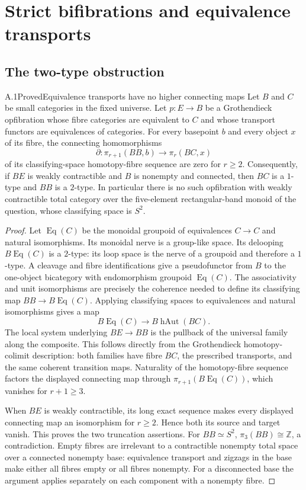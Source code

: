 \section{Strict bifibrations and equivalence transports}
\subsection{The two-type obstruction}

\begin{result}{A.1}{Proved}{Equivalence transports have no higher connecting maps}
Let $B$ and $C$ be small categories in the fixed universe. Let $p:E\to B$ be a Grothendieck opfibration whose fibre categories are equivalent to $C$ and whose transport functors are equivalences of categories. For every basepoint $b$ and every object $x$ of its fibre, the connecting homomorphisms
\[
 \partial:\pi_{r+1}(BB,b)\longrightarrow\pi_r(BC,x)
\]
of its classifying-space homotopy-fibre sequence are zero for $r\geq2$. Consequently, if $BE$ is weakly contractible and $B$ is nonempty and connected, then $BC$ is a $1$-type and $BB$ is a $2$-type. In particular there is no such opfibration with weakly contractible total category over the five-element rectangular-band monoid of the question, whose classifying space is $S^2$.
\end{result}
\begin{proof}
Let $\operatorname{Eq}(C)$ be the monoidal groupoid of equivalences $C\to C$ and natural isomorphisms. Its monoidal nerve is a group-like space. Its delooping $B\operatorname{Eq}(C)$ is a $2$-type: its loop space is the nerve of a groupoid and therefore a $1$-type. A cleavage and fibre identifications give a pseudofunctor from $B$ to the one-object bicategory with endomorphism groupoid $\operatorname{Eq}(C)$. The associativity and unit isomorphisms are precisely the coherence needed to define its classifying map $BB\to B\operatorname{Eq}(C)$. Applying classifying spaces to equivalences and natural isomorphisms gives a map
\[
 B\operatorname{Eq}(C)\longrightarrow B\operatorname{hAut}(BC).
\]
The local system underlying $BE\to BB$ is the pullback of the universal family along the composite. This follows directly from the Grothendieck homotopy-colimit description: both families have fibre $BC$, the prescribed transports, and the same coherent transition maps. Naturality of the homotopy-fibre sequence factors the displayed connecting map through $\pi_{r+1}(B\operatorname{Eq}(C))$, which vanishes for $r+1\geq3$.

When $BE$ is weakly contractible, its long exact sequence makes every displayed connecting map an isomorphism for $r\geq2$. Hence both its source and target vanish. This proves the two truncation assertions. For $BB\simeq S^2$, $\pi_3(BB)\cong\mathbb Z$, a contradiction. Empty fibres are irrelevant to a contractible nonempty total space over a connected nonempty base: equivalence transport and zigzags in the base make either all fibres empty or all fibres nonempty. For a disconnected base the argument applies separately on each component with a nonempty fibre.
\end{proof}

